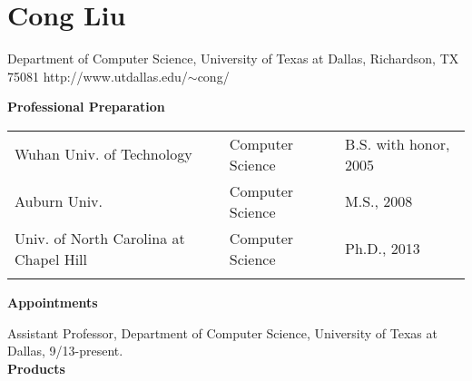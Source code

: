 \documentclass[10pt,letterpaper]{article}
\newcommand{\required}[1]{\section*{\hfil #1\hfil}}                    %
\begin{document}
\required{Cong Liu}
\vspace{-3mm}
\begin{center}
Department of Computer Science, University of Texas at Dallas, Richardson, TX 75081
http://www.utdallas.edu/$\sim$cong/
\end{center}


\noindent \textbf{Professional Preparation}\

	\begin{tabular}{l l l}
		Wuhan Univ. of Technology &  Computer Science & B.S. with honor, 2005 \\
		Auburn Univ. & Computer Science & M.S., 2008 \\
		Univ. of North Carolina at Chapel Hill & Computer Science & Ph.D., 2013\\ \\
	\end{tabular}

\noindent \textbf{Appointments}\

	\hspace{1mm} Assistant Professor, Department of Computer Science, University of Texas at Dallas, 9/13-present. \\
	
\noindent \textbf{Products} 
\end{document}
